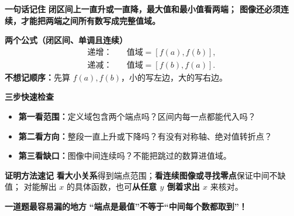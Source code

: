 \clearpage
\begin{summarybox}
    \textbf{\textcolor{CSummary}{一句话记住}}
    \textbf{闭区间上一直升或一直降，最大值和最小值看两端；
    图像还必须连续，才能把两端之间所有数写成完整值域。}

    \medskip
    \textbf{\textcolor{CSummary}{两个公式（闭区间、单调且连续）}}
    \[
        \begin{aligned}
            \text{递增：}\quad &\boxed{\text{值域}=[f(a),f(b)]},\\[3pt]
            \text{递减：}\quad &\boxed{\text{值域}=[f(b),f(a)]}.
        \end{aligned}
    \]
    \textbf{不想记顺序：}先算 $f(a),f(b)$，小的写左边，大的写右边。

    \medskip
    \textbf{\textcolor{CSummary}{三步快速检查}}
    \begin{itemize}[leftmargin=*,itemsep=0.28em,topsep=0.3em]
        \item \textbf{第一看范围：}定义域包含两个端点吗？区间内每一点都能代入吗？
        \item \textbf{第二看方向：}整段一直上升或下降吗？有没有对称轴、绝对值转折点？
        \item \textbf{第三看缺口：}图像中间连续吗？不能把跳过的数算进值域。
    \end{itemize}

    \medskip
    \textbf{\textcolor{CSummary}{证明方法速记}}
    \textbf{看大小关系}得到端点范围；\textbf{看连续图像或寻找零点}保证中间不缺值；
    对能解出 $x$ 的具体函数，也可\textbf{从任意 $y$ 倒着求出 $x$} 来核对。

    \medskip
    \textbf{\textcolor{CSummary}{一道题最容易漏的地方}}
    \textbf{“端点是最值”不等于“中间每个数都取到”！}
\end{summarybox}
